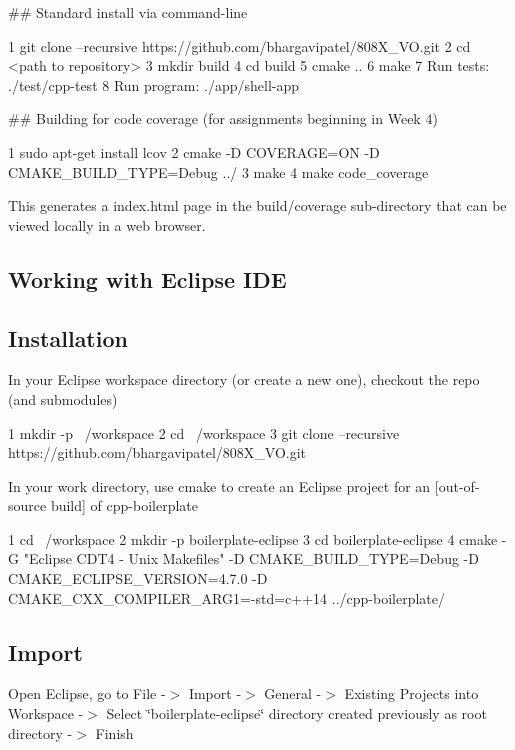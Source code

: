 \#\# Standard install via command-\/line 
\begin{DoxyCode}
1 git clone --recursive https://github.com/bhargavipatel/808X\_VO.git
2 cd <path to repository>
3 mkdir build
4 cd build
5 cmake ..
6 make
7 Run tests: ./test/cpp-test
8 Run program: ./app/shell-app
\end{DoxyCode}


\#\# Building for code coverage (for assignments beginning in Week 4) 
\begin{DoxyCode}
1 sudo apt-get install lcov
2 cmake -D COVERAGE=ON -D CMAKE\_BUILD\_TYPE=Debug ../
3 make
4 make code\_coverage
\end{DoxyCode}
 This generates a index.\+html page in the build/coverage sub-\/directory that can be viewed locally in a web browser.

\subsection*{Working with Eclipse I\+DE}

\subsection*{Installation}

In your Eclipse workspace directory (or create a new one), checkout the repo (and submodules) 
\begin{DoxyCode}
1 mkdir -p ~/workspace
2 cd ~/workspace
3 git clone --recursive https://github.com/bhargavipatel/808X\_VO.git
\end{DoxyCode}


In your work directory, use cmake to create an Eclipse project for an \mbox{[}out-\/of-\/source build\mbox{]} of cpp-\/boilerplate


\begin{DoxyCode}
1 cd ~/workspace
2 mkdir -p boilerplate-eclipse
3 cd boilerplate-eclipse
4 cmake -G "Eclipse CDT4 - Unix Makefiles" -D CMAKE\_BUILD\_TYPE=Debug -D CMAKE\_ECLIPSE\_VERSION=4.7.0 -D
       CMAKE\_CXX\_COMPILER\_ARG1=-std=c++14 ../cpp-boilerplate/
\end{DoxyCode}


\subsection*{Import}

Open Eclipse, go to File -\/$>$ Import -\/$>$ General -\/$>$ Existing Projects into Workspace -\/$>$ Select \char`\"{}boilerplate-\/eclipse\char`\"{} directory created previously as root directory -\/$>$ Finish

